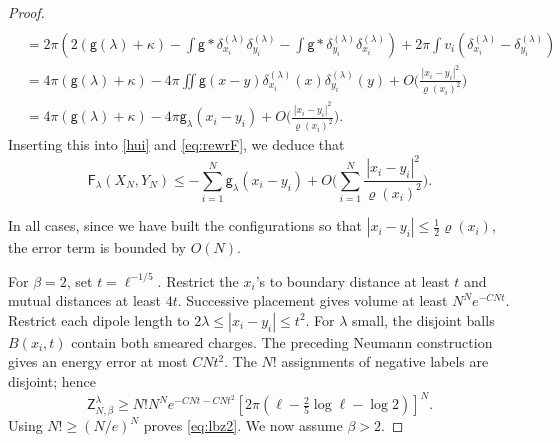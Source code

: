 \documentclass[a4paper,10pt,leqno]{amsart}
\numberwithin{equation}{section}
\def\hal{\frac{1}{2}}
\def\Z{\mathsf{Z}_{N,\beta}^{\lambda}}
\def\g{\mathsf{g}}
\def\F{\mathsf{F}}
\begin{document}
\begin{proof}
\begin{align*}
    \\ &= 2\pi \left( 2 (\g(\lambda)+\kappa) - \int \g*\delta_{x_i}^{(\lambda)} \delta_{y_i}^{(\lambda)} - \int \g*\delta_{y_i}^{(\lambda)} \delta_{x_i}^{(\lambda)} \right) + 2\pi\int v_i \left( \delta_{x_i}^{(\lambda)} - \delta_{y_i}^{(\lambda)}\right)
    \\
    &= 4\pi (\g(\lambda)+\kappa)- 4\pi \iint \g(x-y) \delta_{x_i}^{(\lambda)} (x)\delta_{y_i}^{(\lambda)} (y) + O\Bigr( \frac{|x_i-y_i|^2}{\varrho(x_i)^2}\Bigr)\\
    & = 4\pi (\g(\lambda)+\kappa)- 4\pi \g_\lambda(x_i-y_i)+ O\Bigr( \frac{|x_i-y_i|^2}{\varrho(x_i)^2}\Bigr).
  \end{align*}
  Inserting this into \eqref{hui} and \eqref{eq:rewrF}, we deduce that
  \begin{equation}\label{majof} \F_\lambda(X_N, Y_N) \le - \sum_{i=1}^N \g_\lambda (x_i-y_i) + O\Bigr(\sum_{i=1}^N \frac{|x_i-y_i|^2}{\varrho(x_i)^2}\Bigr).\end{equation}

  In all cases, since we have built the configurations so that $|x_i-y_i|\le \hal \varrho(x_i)$, the error term is bounded by $O(N)$.

  For $\beta=2$, set $t=\ell^{-1/5}$. Restrict the $x_i$'s to boundary distance at least $t$ and mutual distances at least $4t$. Successive placement gives volume at least $N^Ne^{-CNt}$. Restrict each dipole length to $2\lambda\le|x_i-y_i|\le t^2$. For $\lambda$ small, the disjoint balls $B(x_i,t)$ contain both smeared charges. The preceding Neumann construction gives an energy error at most $CNt^2$. The $N!$ assignments of negative labels are disjoint; hence
  \[
    \Z\ge N!N^Ne^{-CNt-CNt^2}
    \left[2\pi\left(\ell-\tfrac25\log\ell-\log2\right)\right]^N.
  \]
  Using $N!\ge(N/e)^N$ proves \eqref{eq:lbz2}. We now assume $\beta>2$.
  \smallskip


\end{proof}
\end{document}
